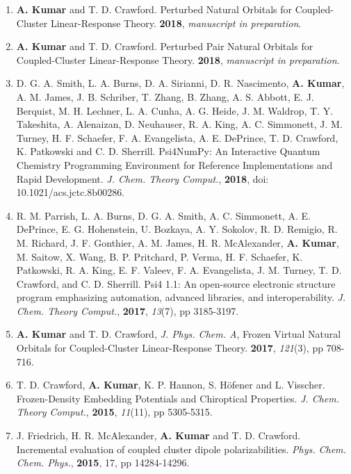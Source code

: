 \begin{enumerate}
\item {\bf A. Kumar} and T. D. Crawford. Perturbed Natural Orbitals for Coupled-Cluster Linear-Response Theory. 
{\bf 2018}, {\em manuscript in preparation}.
\item {\bf A. Kumar} and T. D. Crawford. Perturbed Pair Natural Orbitals for Coupled-Cluster Linear-Response Theory. 
{\bf 2018}, {\em manuscript in preparation}.
\item D. G. A. Smith, L. A. Burns, D. A. Sirianni, D. R. Nascimento, {\bf A. Kumar}, A. M. James, J. B. Schriber, T. Zhang, B. Zhang, 
A. S. Abbott, E. J. Berquist, M. H. Lechner, L. A. Cunha, A. G. Heide, J. M. Waldrop, T. Y. Takeshita, A. Alenaizan, D. Neuhauser,
R. A. King, A. C. Simmonett, J. M. Turney, H. F. Schaefer, F. A. Evangelista, A. E. DePrince, 
T. D. Crawford, K. Patkowski and C. D. Sherrill. Psi4NumPy: An Interactive Quantum Chemistry Programming Environment for 
Reference Implementations and Rapid Development. {\em J. Chem. Theory Comput.}, {\bf 2018}, doi: 10.1021/acs.jctc.8b00286.
\item R. M. Parrish, L. A. Burns, D. G. A. Smith, A. C. Simmonett, A. E. DePrince, E. G. Hohenstein, U. Bozkaya, A. Y. Sokolov, 
R. D. Remigio, R. M. Richard, J. F. Gonthier, A. M. James, H. R. McAlexander, {\bf A. Kumar}, M. Saitow, X. Wang, B. P. Pritchard, 
P. Verma, H. F. Schaefer, K. Patkowski, R. A. King, E. F. Valeev, F. A. Evangelista, J. M. Turney, 
T. D. Crawford, and C. D. Sherrill. Psi4 1.1: An open-source electronic structure program emphasizing automation, advanced libraries, 
and interoperability. {\em J. Chem. Theory Comput.}, {\bf 2017}, {\em 13}(7), pp 3185-3197.
\item {\bf A. Kumar} and T. D. Crawford, {\em J. Phys. Chem. A}, Frozen Virtual Natural Orbitals for Coupled-Cluster 
Linear-Response Theory. {\bf 2017}, {\em 121}(3), pp 708-716.
\item T. D. Crawford, {\bf A. Kumar}, K. P. Hannon, S. H{\"o}fener and L. Visscher. Frozen-Density Embedding 
Potentials and Chiroptical Properties. {\em J. Chem. Theory Comput.}, {\bf 2015}, {\em 11}(11), pp 5305-5315.
\item J. Friedrich, H. R. McAlexander, {\bf A. Kumar} and T. D. Crawford. Incremental evaluation of coupled cluster 
dipole polarizabilities. {\em Phys. Chem. Chem. Phys.}, {\bf 2015}, 17, pp 14284-14296.
\end{enumerate}
